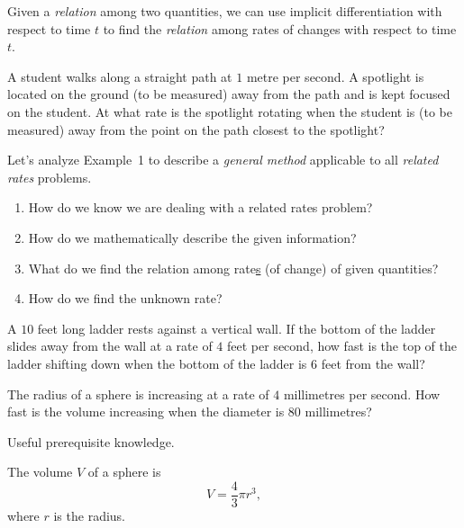 \documentclass[../main.tex]{subfiles}
\begin{document}
Given a \emph{relation} among two quantities, we can use implicit differentiation with respect to time \(t\) to find the \emph{relation} among rates of changes with respect to time \(t\).

\renewcommand{\baselinestretch}{2} \selectfont
\begin{example}
  A student walks along a straight path at \(1\) metre per second.  A spotlight is located on the ground (to be measured)  away from the path and is kept focused on the student. At what rate is the spotlight rotating when the student is (to be measured)  away from the point on the path closest to the spotlight?
\end{example}
\renewcommand{\baselinestretch}{1} \selectfont

\clearpage

Let's analyze Example~1 to describe a \emph{general method} applicable to all \emph{related rates} problems. 

\begin{enumerate}
  \item How do we know we are dealing with a related rates problem?
    \vspace{1.5in}

  \item How do we mathematically describe the given information?
    \vfill

  \item What do we find the relation among rate\underline{s} (of change) of given quantities?
    \vspace{1in}

  \item How do we find the unknown rate?
    \vspace{1.5in}
\end{enumerate}

\clearpage

\begin{example}
  A \(10\) feet long ladder rests against a vertical wall. If the bottom of the ladder slides away from the wall at a rate of \(4\) feet per second, how fast is the top of the ladder shifting down when the bottom of the ladder is \(6\) feet from the wall?
\end{example}
\clearpage

\begin{example}
  The radius of a sphere is increasing at a rate of \(4\) millimetres per second. How fast is the volume increasing when the diameter is \(80\) millimetres?

  \begin{mdframed}[style=sidenote]
    Useful prerequisite knowledge.

    The volume \(V\) of a sphere is 
    \[
      V = \frac{4}{3} \pi r^{3},
    \]
    where \(r\) is the radius.
  \end{mdframed}
\end{example}
\clearpage
\end{document}
